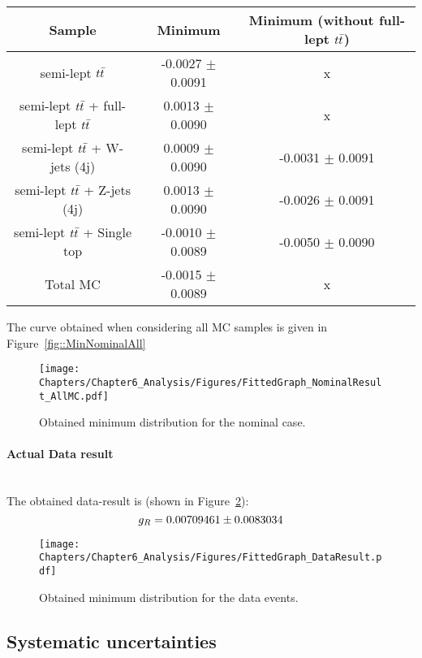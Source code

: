 \begin{table}[h!t]
 \centering
 \caption{} \label{table::BckInfl}
 \renewcommand{\arraystretch}{1.2}
 \begin{tabular}{c|c|c}
  Sample 					& Minimum 			& Minimum (without full-lept $t\bar{t}$) 	\\
  \hline
  semi-lept $t\bar{t}$ 				&  -0.0027 $\pm$ 0.0091 	& x					\\
  semi-lept $t\bar{t}$ + full-lept $t\bar{t}$ 	&  0.0013 $\pm$ 0.0090		& x					\\
  semi-lept $t\bar{t}$ + W-jets (4j) 		&  0.0009 $\pm$ 0.0090		& -0.0031 $\pm$ 0.0091		\\
  semi-lept $t\bar{t}$ + Z-jets (4j) 		&  0.0013 $\pm$ 0.0090		& -0.0026 $\pm$ 0.0091		\\
  semi-lept $t\bar{t}$ + Single top 		&  -0.0010 $\pm$ 0.0089		& -0.0050 $\pm$ 0.0090		\\
  \hline
  Total MC 					& -0.0015 $\pm$ 0.0089 		& x
 \end{tabular}
\end{table}
The curve obtained when considering all MC samples is given in Figure~\ref{fig::MinNominalAll}
\begin{figure}[h!t]
 \centering
 \texttt{[image: Chapters/Chapter6\_Analysis/Figures/FittedGraph\_NominalResult\_AllMC.pdf]}
 \caption{Obtained minimum distribution for the nominal case.} \label{fig::MinNominal}
\end{figure}

\paragraph{Actual Data result} \hfill \\

The obtained data-result is (shown in Figure~\ref{fig::MinData}):
\begin{equation}
 g_{R} = 0.00709461 \pm 0.0083034
\end{equation}

\begin{figure}[h!t]
 \centering
 \texttt{[image: Chapters/Chapter6\_Analysis/Figures/FittedGraph\_DataResult.pdf]}
 \caption{Obtained minimum distribution for the data events.} \label{fig::MinData}
\end{figure}


\subsection{Systematic uncertainties}

